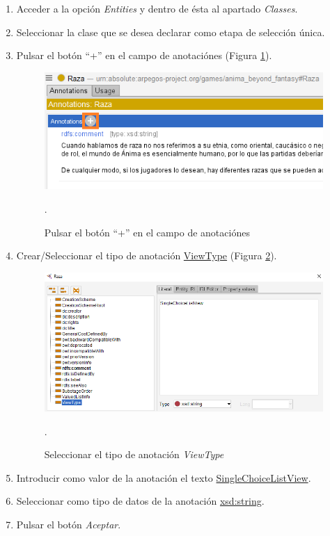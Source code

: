 \begin{enumerate}
    \item Acceder a la opción \textit{Entities} y dentro de ésta al apartado \textit{Classes}.
    \item Seleccionar la clase que se desea declarar como etapa de selección única.
    \item Pulsar el botón “+” en el campo de anotaciónes (Figura \ref*{UniqueSelection_1}).
    \begin{figure}[ht]
        \centering
        \includegraphics[scale=0.6]{Figures/Protege/UniqueSelection_1.png}
        \caption{Pulsar el botón “+” en el campo de anotaciónes}.
        \label{UniqueSelection_1}
    \end{figure}

    \item Crear/Seleccionar el tipo de anotación \underline{ViewType} (Figura \ref*{UniqueSelection_2}).
    \begin{figure}[ht]
        \centering
        \includegraphics[scale=0.6]{Figures/Protege/UniqueSelection_2.png}
        \caption{Seleccionar el tipo de anotación \textit{ViewType}}.
        \label{UniqueSelection_2}
    \end{figure}

    \item Introducir como valor de la anotación el texto \underline{SingleChoiceListView}.
    \item Seleccionar como tipo de datos de la anotación \underline{xsd:string}.
    \item Pulsar el botón \textit{Aceptar}.
\end{enumerate}

